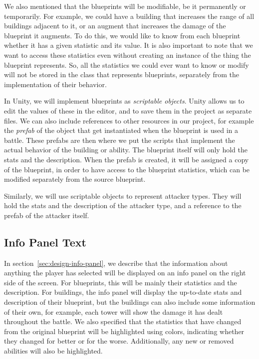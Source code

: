 We also mentioned that the blueprints will be modifiable, be it permanently or temporarily.
For example, we could have a building that increases the range of all buildings adjacent to it, or an augment that increases the damage of the blueprint it augments.
To do this, we would like to know from each blueprint whether it has a given statistic and its value.
It is also important to note that we want to access these statistics even without creating an instance of the thing the blueprint represents.
So, all the statistics we could ever want to know or modify will not be stored in the class that represents blueprints, separately from the implementation of their behavior.

In Unity, we will implement blueprints as \emph{scriptable objects}.
Unity allows us to edit the values of these in the editor, and to save them in the project as separate files.
We can also include references to other resources in our project, for example the \emph{prefab} of the object that get instantiated when the blueprint is used in a battle.
These prefabs are then where we put the scripts that implement the actual behavior of the building or ability.
The blueprint itself will only hold the stats and the description.
When the prefab is created, it will be assigned a copy of the blueprint, in order to have access to the blueprint statistics, which can be modified separately from the source blueprint.

Similarly, we will use scriptable objects to represent attacker types.
They will hold the stats and the description of the attacker type, and a reference to the prefab of the attacker itself.

\subsection{Info Panel Text}
In section~\ref{sec:design-info-panel}, we describe that the information about anything the player has selected will be displayed on an info panel on the right side of the screen.
For blueprints, this will be mainly their statistics and the description.
For buildings, the info panel will display the up-to-date stats and description of their blueprint, but the buildings can also include some information of their own, for example, each tower will show the damage it has dealt throughout the battle.
We also specified that the statistics that have changed from the original blueprint will be highlighted using colors, indicating whether they changed for better or for the worse.
Additionally, any new or removed abilities will also be highlighted.

